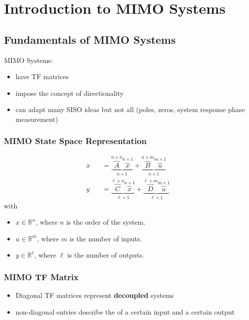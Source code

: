 \section{Introduction to MIMO Systems}
\subsection{Fundamentals of MIMO Systems}

MIMO Systems:
\begin{itemize}
    \item have TF matrices
    \item impose the concept of directionality
    \item can adapt many SISO ideas but not all (poles, zeros, system response phase measurement)
\end{itemize}

\subsubsection{MIMO State Space Representation}
\begin{align*}
    \dot{x} & =\underbrace{\overbrace{A}^{n\times n}\overbrace{x}^{n\times1}}_{n\times1}+\underbrace{\overbrace{B}^{n\times m}\overbrace{u}^{m\times1}}_{n\times1}             \\
    y\quad  & =\underbrace{\overbrace{C}^{\ell\times n}\overbrace{x}^{n\times1}}_{\ell\times1}+\underbrace{\overbrace{D}^{\ell\times m}\overbrace{u}^{m\times1}}_{\ell\times1}
\end{align*}
with
\begin{itemize}
    \item $x\in\mathbb{R}^n$, where $n$ is the order of the system.
    \item $u\in\mathbb{R}^m$, where $m$ is the number of inputs.
    \item $y\in\mathbb{R}^\ell$, where $\ell$ is the number of outputs.
\end{itemize}

\subsubsection{MIMO TF Matrix}

\begin{itemize}
    \item Diagonal TF matrices represent \textbf{decoupled} systems
    \item non-diagonal entries describe the of a certain input and a certain output
\end{itemize}

